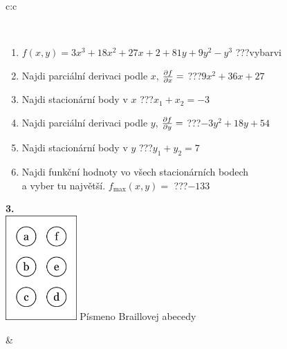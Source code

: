 \documentclass[10pt]{report}
\begin{document}
\begin{tabular}{c:c}
\begin{minipage}[c][104.5mm][t]{0.5\linewidth}
\begin{center}
\begin{minipage}{0.95\linewidth}
\begin{center}
\end{center}
\end{minipage}
\\[1mm]
\begin{minipage}{0.79\linewidth}
\begin{center}
\begin{varwidth}{\linewidth}
\begin{enumerate}
\normalsize
\item $f(x,y)=3x^3+18x^2+27x+2+81y+9y^2-y^3$\quad \dotfill\; ???\;\dotfill \quad vybarvi
\item Najdi parciální derivaci podle $x$, $\pdv{f}{x}=$\quad \dotfill\; ???\;\dotfill \quad $9x^2+36x+27$
\item Najdi stacionární body v $x$\quad \dotfill\; ???\;\dotfill \quad $x_1+x_2=-3$
\item Najdi parciální derivaci podle $y$, $\pdv{f}{y}=$\quad \dotfill\; ???\;\dotfill \quad $-3y^2+18y+54$
\item Najdi stacionární body v $y$\quad \dotfill\; ???\;\dotfill \quad $y_1+y_2=7$
\item Najdi funkční hodnoty vo všech stacionárních bodech \\ \phantom{xxxxxx} a vyber tu najvětší. $f_{\text{max}}(x,y)=$\quad \dotfill\; ???\;\dotfill \quad $-133$
\end{enumerate}
\end{varwidth}
\end{center}
\end{minipage}
\begin{minipage}{0.20\linewidth}
\begin{center}
{\Huge\bfseries 3.} \\[2mm]
\includegraphics[height=40mm]{../images/braille.png}
{\small Písmeno Braillovej abecedy}
\end{center}
\end{minipage}
\end{center}
\end{minipage}
&
\begin{minipage}[c][104.5mm][t]{0.5\linewidth}
\begin{center}

\end{center}
\end{minipage}
\end{tabular}
\end{document}
